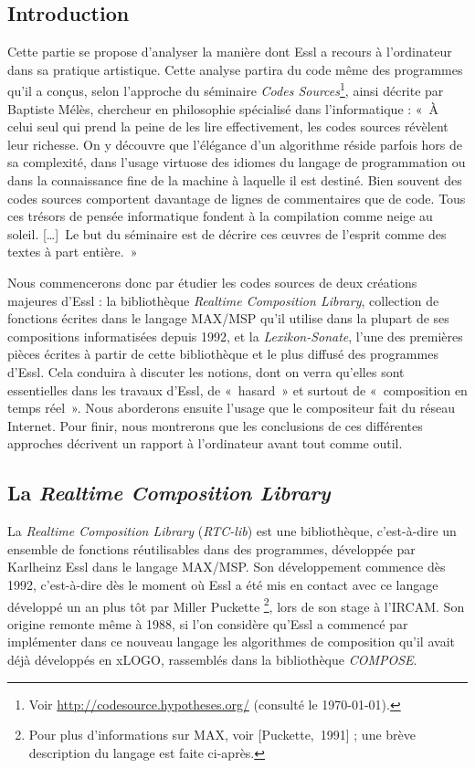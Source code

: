 \documentclass[a4paper,12pt]{article}
\newcommand{\guill}[1]{«~#1~»}
\newcommand{\tpp}[0]{[\dots]}
\newcommand{\cicite}[1]{{\footnotesize[#1]}}
\begin{document}
\subsection{Introduction}

Cette partie se propose d'analyser la manière dont Essl a recours à l'ordinateur dans sa pratique artistique. Cette analyse partira du code même des programmes qu'il a conçus, selon l'approche du séminaire \emph{Codes Sources}\footnote{Voir \href{http://codesource.hypotheses.org/}{http://codesource.hypotheses.org/} (consulté le \today).}, ainsi décrite par Baptiste Mélès, chercheur en philosophie spécialisé dans l'informatique : \guill{À celui seul qui prend la peine de les lire effectivement, les codes sources révèlent leur richesse. On y découvre que l’élégance d’un algorithme réside parfois hors de sa complexité, dans l’usage virtuose des idiomes du langage de programmation ou dans la connaissance fine de la machine à laquelle il est destiné. Bien souvent des codes sources comportent davantage de lignes de commentaires que de code. Tous ces trésors de pensée informatique fondent à la compilation comme neige au soleil. \tpp~Le but du séminaire est de décrire ces œuvres de l’esprit comme des textes à part entière.}

Nous commencerons donc par étudier les codes sources de deux créations majeures d'Essl : la bibliothèque \emph{Realtime Composition Library}, collection de fonctions écrites dans le langage MAX/MSP qu'il utilise dans la plupart de ses compositions informatisées depuis 1992, et la \emph{Lexikon-Sonate}, l'une des premières pièces écrites à partir de cette bibliothèque et le plus diffusé des programmes d'Essl. Cela conduira à discuter les notions, dont on verra qu'elles sont essentielles dans les travaux d'Essl, de \guill{hasard} et surtout de \guill{composition en temps réel}. Nous aborderons ensuite l'usage que le compositeur fait du réseau Internet. Pour finir, nous montrerons que les conclusions de ces différentes approches décrivent un rapport à l'ordinateur avant tout comme outil.


\subsection{La \emph{Realtime Composition Library}}
\label{rtclib}

La \emph{Realtime Composition Library} (\emph{RTC-lib}) est une bibliothèque, c'est-à-dire un ensemble de fonctions réutilisables dans des programmes, développée par Karlheinz Essl dans le langage MAX/MSP. Son développement commence dès 1992, c'est-à-dire dès le moment où Essl a été mis en contact avec ce langage développé un an plus tôt par Miller Puckette \footnote{Pour plus d'informations sur MAX, voir \cicite{Puckette,~1991} ; une brève description du langage est faite ci-après.}, lors de son stage à l'IRCAM. Son origine remonte même à 1988, si l'on considère qu'Essl a commencé par implémenter dans ce nouveau langage les algorithmes de composition qu'il avait déjà développés en xLOGO, rassemblés dans la bibliothèque \emph{COMPOSE}.
\end{document}
